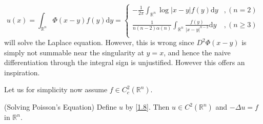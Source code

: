 \begin{equation}\label{1.8}
u\left( x \right) =\int_{\mathbb{R} ^n}{\Phi \left( x-y \right) f\left( y \right) \mathrm{d}y}=\left\{ \begin{aligned}
	-\frac{1}{2\pi}\int_{\mathbb{R} ^n}{\log \left| x-y \right|f\left( y \right) \mathrm{d}y}&,\left( n=2 \right)\\
	\frac{1}{n\left( n-2 \right) \alpha \left( n \right)}\int_{\mathbb{R} ^n}{\frac{f\left( y \right)}{\left| x-y \right|^{n-2}}\mathrm{d}y}&,\left( n\ge 3 \right)\\
\end{aligned} \right. 
\end{equation}
will solve the Laplace equation. However, this is wrong since $D^2\Phi(x-y)$ is simply not summable near the singularity at $y=x$, and hence the naive differentiation through the integral sign is unjustified. However this offers an inspiration.\par
Let us for simplicity now assume $f\in C_c^2(\mathbb{R}^n)$.
\begin{theorem}(Solving Poisson's Equation)\label{Thm1.2.3}
Define $u$ by \eqref{1.8}. Then $u\in C^2(\mathbb{R}^n)$ and $-\Delta u=f$ in $\mathbb{R}^n$.
\end{theorem}
